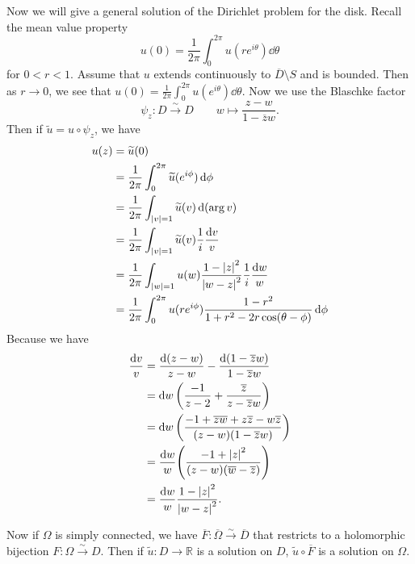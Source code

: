 \documentclass[leqno, openany]{memoir}
\theoremstyle{definition}
\theoremstyle{remark}
\theoremstyle{plain}
\theoremstyle{definition}
\theoremstyle{remark}
\newcommand{\R}{\mathbb{R}}
\newcommand{\ol}[1]{\overline{#1}}
\newcommand{\wt}[1]{\widetilde{#1}}
\begin{document}
Now we will give a general solution of the Dirichlet problem for the disk.
Recall the mean value property \[ u(0) = \frac{1}{2\pi} \int_0^{2\pi}
u(re^{i\theta}) \dd{\theta} \] for $0 < r < 1$. Assume that $u$ extends
continuously to $\ol{D} \setminus S$ and is bounded. Then as $r \to 0$, we see
that $u(0) = \frac{1}{2\pi} \int_0^{2\pi} u(e^{i\theta}) \dd{\theta}$. Now we
use the Blaschke factor \[ \psi_z \colon D \xrightarrow{\sim} D \qquad w
    \mapsto \frac{z-w}{1-\ol{z}w}. \] Then if $\wt{u} = u \circ \psi_z$, we
    have \begin{align*} u(z) &= \wt{u}(0) \\ &= \frac{1}{2\pi} \int_0^{2\pi}
        \wt{u}(e^{i\phi}) \dd{\phi} \\ &= \frac{1}{2\pi} \int_{\abs{v}=1}
        \wt{u}(v) \dd{(\arg v)} \\ &= \frac{1}{2\pi} \int_{\abs{v}=1} \wt{u}(v)
        \frac{1}{i} \frac{\dd{v}}{v} \\ &= \frac{1}{2\pi} \int_{\abs{w}=1} u(w)
        \frac{1-\abs{z}^2}{\abs{w-z}^2} \frac{1}{i} \frac{\dd{w}}{w} \\ &=
        \frac{1}{2\pi} \int_0^{2\pi} u(re^{i\phi})
        \frac{1-r^2}{1+r^2-2r\cos(\theta-\phi)} \dd{\phi} \end{align*} Because
        we have \begin{align*} \frac{\dd{v}}{v} &= \frac{\dd{(z-w)}}{z-w} -
            \frac{\dd{(1-\ol{z}w)}}{1-\ol{z}w} \\ &= \dd{w} \qty(\frac{-1}{z-2}
            + \frac{\ol{z}}{z-\ol{z}w}) \\ &= \dd{w} \qty(\frac{{-1 +
            \ol{z}\ol{w} + z \ol{z} - w \ol{z}}}{(z-w)(1-\ol{z}w)}) \\ &=
            \frac{\dd{w}}{w} \qty(\frac{-1 + \abs{z}^2}{(z-w)(\ol{w}-\ol{z})})
            \\ &= \frac{\dd{w}}{w} \frac{1-\abs{z}^2}{\abs{w-z}^2}.
        \end{align*}

Now if $\Omega$ is simply connected, we have $\ol{F} \colon \ol{\Omega}
\xrightarrow{\sim} \ol{D}$ that restricts to a holomorphic bijection $F \colon
\Omega \xrightarrow{\sim} D$. Then if $\wt{u} \colon D \to \R$ is a solution on
$D$, $\wt{u} \circ \ol{F}$ is a solution on $\Omega$.
\end{document}
